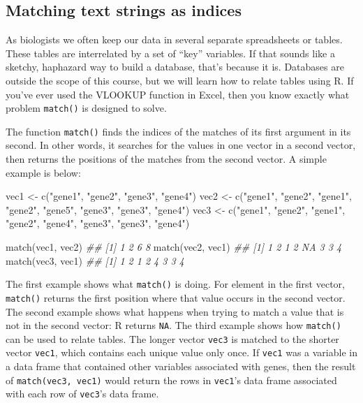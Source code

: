 \documentclass[
  13,
  letterpaper,
]{report}
\newenvironment{Shaded}{\begin{snugshade}}{\end{snugshade}}
\newcommand{\DocumentationTok}[1]{\textcolor[rgb]{0.37,0.37,0.37}{\textit{#1}}}
\newcommand{\FunctionTok}[1]{\textcolor[rgb]{0.28,0.35,0.67}{#1}}
\newcommand{\NormalTok}[1]{\textcolor[rgb]{0.00,0.23,0.31}{#1}}
\newcommand{\OtherTok}[1]{\textcolor[rgb]{0.00,0.23,0.31}{#1}}
\newcommand{\StringTok}[1]{\textcolor[rgb]{0.13,0.47,0.30}{#1}}
\begin{document}
\subsection{Matching text strings as indices}\label{sec-ie-char-inds}

As biologists we often keep our data in several separate spreadsheets or
tables. These tables are interrelated by a set of ``key'' variables. If
that sounds like a sketchy, haphazard way to build a database, that's
because it is. Databases are outside the scope of this course, but we
will learn how to relate tables using R. If you've ever used the VLOOKUP
function in Excel, then you know exactly what problem \texttt{match()}
is designed to solve.

The function \texttt{match()} finds the indices of the matches of its
first argument in its second. In other words, it searches for the values
in one vector in a second vector, then returns the positions of the
matches from the second vector. A simple example is below:

\begin{Shaded}
\begin{Highlighting}[]

\NormalTok{vec1 }\OtherTok{\textless{}{-}} \FunctionTok{c}\NormalTok{(}\StringTok{"gene1"}\NormalTok{, }\StringTok{"gene2"}\NormalTok{, }\StringTok{"gene3"}\NormalTok{, }\StringTok{"gene4"}\NormalTok{)}
\NormalTok{vec2 }\OtherTok{\textless{}{-}} \FunctionTok{c}\NormalTok{(}\StringTok{"gene1"}\NormalTok{, }\StringTok{"gene2"}\NormalTok{, }\StringTok{"gene1"}\NormalTok{, }\StringTok{"gene2"}\NormalTok{, }
          \StringTok{"gene5"}\NormalTok{, }\StringTok{"gene3"}\NormalTok{, }\StringTok{"gene3"}\NormalTok{, }\StringTok{"gene4"}\NormalTok{)}
\NormalTok{vec3 }\OtherTok{\textless{}{-}} \FunctionTok{c}\NormalTok{(}\StringTok{"gene1"}\NormalTok{, }\StringTok{"gene2"}\NormalTok{, }\StringTok{"gene1"}\NormalTok{, }\StringTok{"gene2"}\NormalTok{, }
          \StringTok{"gene4"}\NormalTok{, }\StringTok{"gene3"}\NormalTok{, }\StringTok{"gene3"}\NormalTok{, }\StringTok{"gene4"}\NormalTok{)}

\FunctionTok{match}\NormalTok{(vec1, vec2)}
\DocumentationTok{\#\# [1] 1 2 6 8}
\FunctionTok{match}\NormalTok{(vec2, vec1)}
\DocumentationTok{\#\# [1]  1  2  1  2 NA  3  3  4}
\FunctionTok{match}\NormalTok{(vec3, vec1)}
\DocumentationTok{\#\# [1] 1 2 1 2 4 3 3 4}
\end{Highlighting}
\end{Shaded}

The first example shows what \texttt{match()} is doing. For element in
the first vector, \texttt{match()} returns the first position where that
value occurs in the second vector. The second example shows what happens
when trying to match a value that is not in the second vector: R returns
\texttt{NA}. The third example shows how \texttt{match()} can be used to
relate tables. The longer vector \texttt{vec3} is matched to the shorter
vector \texttt{vec1}, which contains each unique value only once. If
\texttt{vec1} was a variable in a data frame that contained other
variables associated with genes, then the result of
\texttt{match(vec3,\ vec1)} would return the rows in \texttt{vec1}'s
data frame associated with each row of \texttt{vec3}'s data frame.
\end{document}
